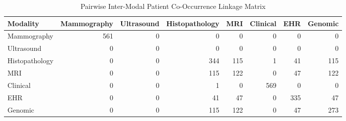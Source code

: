 \begin{table}
\caption{Pairwise Inter-Modal Patient Co-Occurrence Linkage Matrix}
\label{tab:table_p2_cross_modality_linkage_matrix}
\begin{tabular}{lrrrrrrr}
\toprule
Modality & Mammography & Ultrasound & Histopathology & MRI & Clinical & EHR & Genomic \\
\midrule
Mammography & 561 & 0 & 0 & 0 & 0 & 0 & 0 \\
Ultrasound & 0 & 0 & 0 & 0 & 0 & 0 & 0 \\
Histopathology & 0 & 0 & 344 & 115 & 1 & 41 & 115 \\
MRI & 0 & 0 & 115 & 122 & 0 & 47 & 122 \\
Clinical & 0 & 0 & 1 & 0 & 569 & 0 & 0 \\
EHR & 0 & 0 & 41 & 47 & 0 & 335 & 47 \\
Genomic & 0 & 0 & 115 & 122 & 0 & 47 & 273 \\
\bottomrule
\end{tabular}
\end{table}
